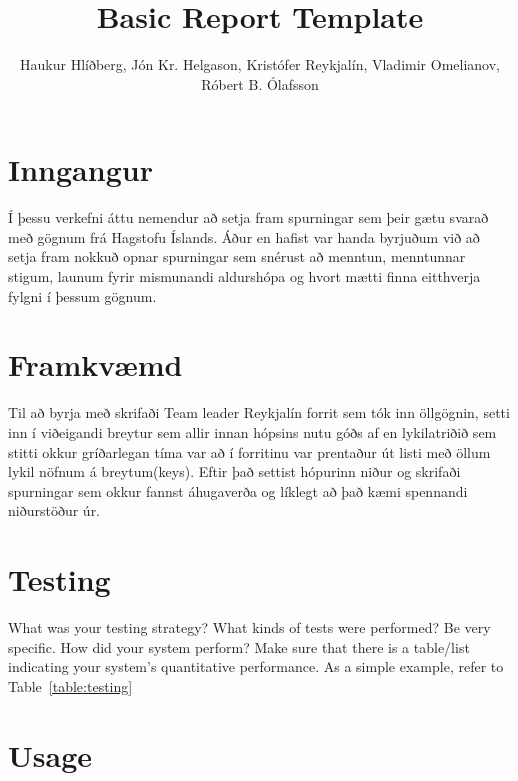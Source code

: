 \documentclass[12pt, svn, draft]{rureport}
\author{Haukur Hlíðberg, Jón Kr. Helgason, Kristófer Reykjalín, Vladimir Omelianov, Róbert B. Ólafsson}  %
\title{Basic Report Template}  %
\begin{document}
\maketitle  %
\listoffixmes{}


\section{Inngangur} %
Í þessu verkefni áttu nemendur að setja fram spurningar sem þeir gætu svarað með gögnum frá Hagstofu Íslands. Áður en hafist var handa byrjuðum við að setja fram nokkuð opnar spurningar sem snérust að menntun, menntunnar stigum, launum fyrir mismunandi aldurshópa og hvort mætti finna eitthverja fylgni í þessum gögnum.



\section{Framkvæmd}
Til að byrja með skrifaði Team leader Reykjalín forrit sem tók inn öllgögnin, setti inn í viðeigandi breytur sem allir innan hópsins nutu góðs af en lykilatriðið sem stitti okkur gríðarlegan tíma var að í forritinu var prentaður út listi með öllum lykil nöfnum á breytum(keys). Eftir það settist hópurinn niður og skrifaði spurningar sem okkur fannst áhugaverða og líklegt að það kæmi spennandi niðurstöður úr.

\section{Testing}
What was your testing strategy?  What kinds of tests were performed? Be very specific.  How did your system perform?  Make sure that there is a table/list indicating your system's quantitative performance. As a simple example, refer to Table~\ref{table:testing}



\section{Usage}
\end{document}
